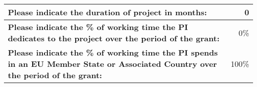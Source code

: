 \begin{tabular}{|p{15cm}|r|}
  \hline
  \textbf{Please indicate the duration of project in months:} & 0 \\
  \hline
  \textbf{Please indicate the \% of working time the PI dedicates to
    the project over the period of the grant:} & 0\% \\
  \hline
  \textbf{Please indicate the \% of working time the PI spends in an EU
    Member State or Associated Country over the period of the grant:} & 100\% \\
  \hline
\end{tabular}


